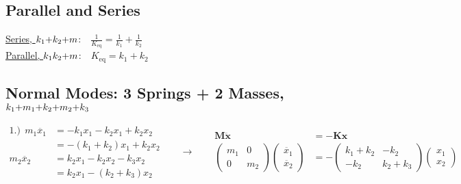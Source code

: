 \documentclass[12pt]{article}
\begin{document}
\newpage
\subsection{Parallel and Series}

\vspace{10pt}\noindent
\underline{Series, \(k_1 {\scriptsize+} k_2 {\scriptsize+} m\)}:\ \
    \(\displaystyle\frac{1}{K_\text{eq}} = \frac{1}{k_1} + \frac{1}{k_2}\)\\[10pt]
\underline{Parallel, \(k_1 k_2 {\scriptsize+} m\)}:\ \ \(K_\text{eq} = k_1 + k_2\)

\vspace{15pt}
\subsection{Normal Modes: 3 Springs + 2 Masses, 
    \(k_1 {\scriptsize+} m_1 {\scriptsize+} k_2 {\scriptsize+} m_2 {\scriptsize+} k_3\)}

\vspace{15pt}\noindent
\(\begin{aligned}    
    1.)\ \ m_1\ddot{x_1} &= -k_1 x_1 - k_2 x_1 + k_2 x_2 \\[5pt]
        &= -(k_1 + k_2) x_1 + k_2 x_2\\[15pt]
    m_2\ddot{x_2} &= k_2 x_1 - k_2 x_2 - k_3 x_2  \\[5pt]
        &= k_2 x_1 - (k_2 + k_3) x_2
\end{aligned}
\hspace{20pt}
\rightarrow
\hspace{20pt}
\begin{aligned}
    \mathbf{M\ddot{x}} &= \mathbf{-Kx}\\[10pt]
    \left(\begin{matrix}
        m_1 & 0 \\
        0 & m_2
    \end{matrix}\right)
    \left(\begin{matrix}
        \ddot{x_1}\\
        \ddot{x_2}
    \end{matrix}\right) &= 
    -\left(\begin{matrix}
        k_1 + k_2 & -k_2\\
        -k_2 & k_2 + k_3
    \end{matrix}\right)
    \left(\begin{matrix}
        x_1\\
        x_2
    \end{matrix}\right)
\end{aligned}\)
\end{document}
